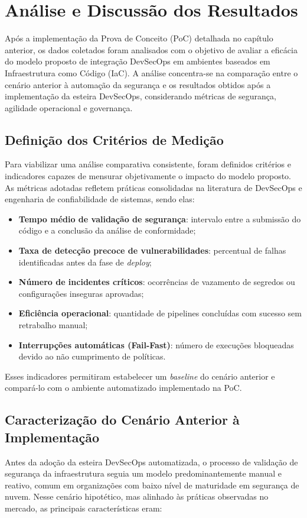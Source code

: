 \chapter{Análise e Discussão dos Resultados}
Após a implementação da Prova de Conceito (PoC) detalhada no capítulo anterior, os dados coletados foram analisados com o objetivo de avaliar a eficácia do modelo proposto de integração DevSecOps em ambientes baseados em Infraestrutura como Código (IaC). A análise concentra-se na comparação entre o cenário anterior à automação da segurança e os resultados obtidos após a implementação da esteira DevSecOps, considerando métricas de segurança, agilidade operacional e governança.

\section{Definição dos Critérios de Medição}
Para viabilizar uma análise comparativa consistente, foram definidos critérios e indicadores capazes de mensurar objetivamente o impacto do modelo proposto. As métricas adotadas refletem práticas consolidadas na literatura de DevSecOps e engenharia de confiabilidade de sistemas, sendo elas:

\begin{itemize}
    \item \textbf{Tempo médio de validação de segurança}: intervalo entre a submissão do código e a conclusão da análise de conformidade;
    \item \textbf{Taxa de detecção precoce de vulnerabilidades}: percentual de falhas identificadas antes da fase de \textit{deploy};
    \item \textbf{Número de incidentes críticos}: ocorrências de vazamento de segredos ou configurações inseguras aprovadas;
    \item \textbf{Eficiência operacional}: quantidade de pipelines concluídas com sucesso sem retrabalho manual;
    \item \textbf{Interrupções automáticas (Fail-Fast)}: número de execuções bloqueadas devido ao não cumprimento de políticas.
\end{itemize}

Esses indicadores permitiram estabelecer um \textit{baseline} do cenário anterior e compará-lo com o ambiente automatizado implementado na PoC.

\section{Caracterização do Cenário Anterior à Implementação}
Antes da adoção da esteira DevSecOps automatizada, o processo de validação de segurança da infraestrutura seguia um modelo predominantemente manual e reativo, comum em organizações com baixo nível de maturidade em segurança de nuvem. Nesse cenário hipotético, mas alinhado às práticas observadas no mercado, as principais características eram:


